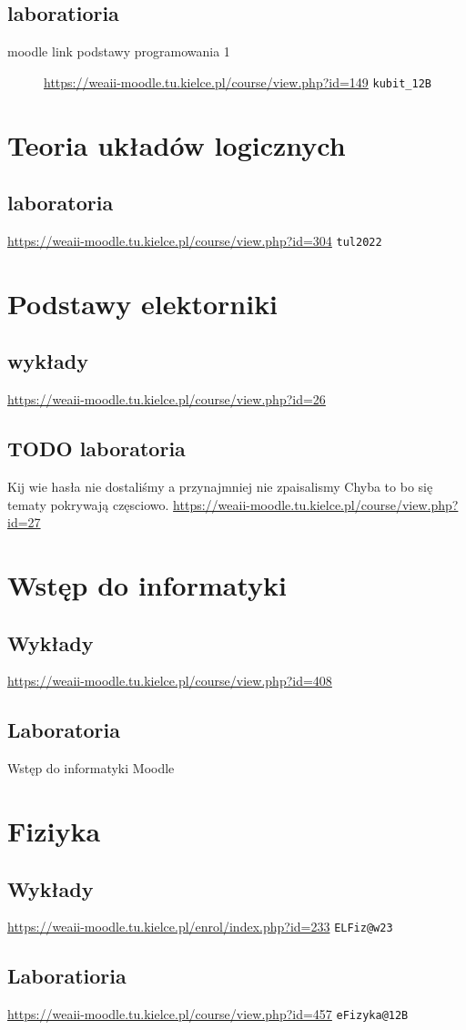 \documentclass[11pt]{article}
\begin{document}
\subsection{laboratioria}
\label{sec:org87132fa}
\begin{description}
\item[{moodle link podstawy programowania 1}] \url{https://weaii-moodle.tu.kielce.pl/course/view.php?id=149} \texttt{kubit\_12B}
\end{description}
\section{Teoria układów logicznych}
\label{sec:org292951a}
\subsection{laboratoria}
\label{sec:orgf71b9b1}
\url{https://weaii-moodle.tu.kielce.pl/course/view.php?id=304} \texttt{tul2022}
\section{Podstawy elektorniki}
\label{sec:org8de3321}
\subsection{wykłady}
\label{sec:org64dc970}
\url{https://weaii-moodle.tu.kielce.pl/course/view.php?id=26}
\subsection{{\bfseries\sffamily TODO} laboratoria}
\label{sec:org65090b8}
Kij wie hasła nie dostaliśmy a przynajmniej nie zpaisalismy
Chyba to bo się tematy pokrywają częsciowo.
\url{https://weaii-moodle.tu.kielce.pl/course/view.php?id=27}
\section{Wstęp do informatyki}
\label{sec:org47d5b76}
\subsection{Wykłady}
\label{sec:orgffa956a}
\url{https://weaii-moodle.tu.kielce.pl/course/view.php?id=408}
\subsection{Laboratoria}
\label{sec:orga50c08b}
\begin{description}
\item[{Wstęp do informatyki Moodle}] 
\end{description}
\section{Fiziyka}
\label{sec:org8219e76}
\subsection{Wykłady}
\label{sec:orge42a0b1}
\url{https://weaii-moodle.tu.kielce.pl/enrol/index.php?id=233} \texttt{ELFiz@w23}
\subsection{Laboratioria}
\label{sec:org19125e3}
\url{https://weaii-moodle.tu.kielce.pl/course/view.php?id=457} \texttt{eFizyka@12B}
\end{document}
